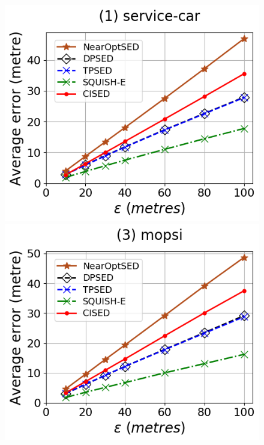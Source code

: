 \begin{figure}[tb!]
	\centering
	\includegraphics[scale=0.315]{Figures/Exp-error-epsilon-service.png}	\hspace{1ex}
	\includegraphics[scale=0.315]{Figures/Exp-error-epsilon-mopsi.png}	\hspace{1ex}

\end{figure}
